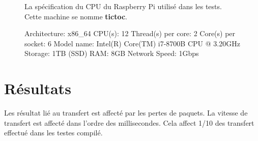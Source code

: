 \begin{figure}[h]
  \caption{La spécification du CPU du Raspberry Pi utilisé dans les tests.
  Cette machine se nomme \textbf{tictoc}.}
\end{figure}

\begin{figure}[h]
  \begin{mplisting}{1}
Architecture:        x86_64
CPU(s):              12
Thread(s) per core:  2
Core(s) per socket:  6
Model name:          Intel(R) Core(TM) i7-8700B CPU @ 3.20GHz
Storage:             1TB (SSD)
RAM:                 8GB
Network Speed:       1Gbps
\end{mplisting}
\end{figure}

\section{Résultats}
Les résultat lié au transfert est affecté par les pertes de paquets.
La vitesse de transfert est affecté dans l'ordre des millisecondes.
Cela affect 1/10 des transfert effectué dans les testes compilé.


